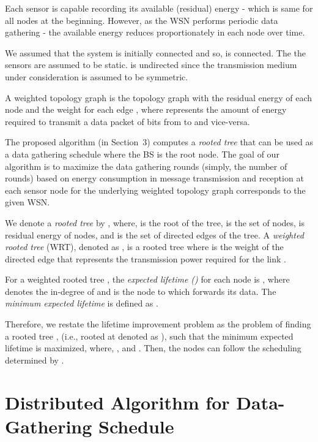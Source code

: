 \documentclass[10pt]{llncs}
\begin{document}
Each sensor  is capable recording its available (residual) energy  - which is same for all nodes at the beginning. However, as the WSN performs periodic data gathering - the available energy reduces proportionately in each node over time. 

We assumed that the system is initially connected and so,  is connected. The the sensors are assumed to be static.  is undirected since the transmission medium under consideration is assumed to be symmetric.

\begin{definition}
A weighted topology graph  is the topology graph  with  the residual energy of each node  and the weight  for each edge , where  represents the amount of energy required to transmit a data packet of  bits from  to  and vice-versa.
\end{definition}

The proposed algorithm (in Section~3) computes a {\it rooted tree} that can be used as a data gathering schedule where the BS is the root node. The goal of our algorithm is to maximize the data gathering rounds (simply, the number of rounds) based on energy consumption in message transmission and reception at each sensor node for the underlying weighted topology graph  corresponds to the given WSN.

We denote a {\it rooted tree} by , where,  is the root of the tree,  is the set of nodes,  is residual energy of nodes, and  is the set of directed edges of the tree. A {\it weighted rooted tree} (WRT), denoted as , is a rooted tree where  is the weight of the directed edge  that represents the transmission power required for the link .

\begin{definition}
For a weighted rooted tree , the {\it expected lifetime ()} for each node  is , where  denotes the in-degree of  and  is the node to which  forwards its data. The {\it minimum expected lifetime} is defined as .
\end{definition}

Therefore, we restate the lifetime improvement problem as the problem of finding a rooted tree , (i.e., rooted at  denoted as ), such that the minimum expected lifetime  is maximized, where, , and . Then, the nodes can follow the scheduling determined by .

\section{Distributed Algorithm for Data-Gathering Schedule}
\end{document}
